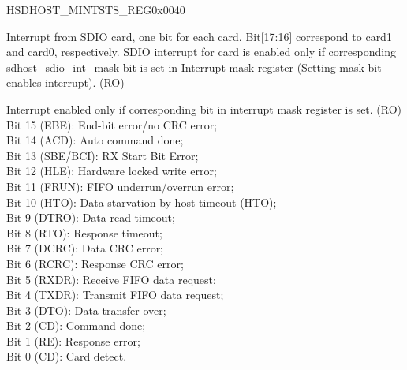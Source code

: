 \begin{register}{H}{SDHOST\_MINTSTS\_REG}{0x{}0040}\label{regdesc:MINTSTSREG}
%
%
%
\regnewline%
\begin{regdesc}\begin{reglist}
\item [SDHOST\_SDIO\_INTERRUPT\_MSK]Interrupt from SDIO card, one bit for each card. Bit[17:16] correspond to card1 and card0, respectively. SDIO interrupt for card is enabled only if corresponding sdhost\_sdio\_int\_mask bit is set in Interrupt mask register (Setting mask bit enables interrupt). (RO)
\item [SDHOST\_INT\_STATUS\_MSK]Interrupt enabled only if corresponding bit in interrupt mask register is set. (RO)\\
Bit 15 (EBE): End-bit error/no CRC error;\\
Bit 14 (ACD): Auto command done;\\
Bit 13 (SBE/BCI): RX Start Bit Error;\\
Bit 12 (HLE): Hardware locked write error; \\
Bit 11 (FRUN): FIFO underrun/overrun error;\\
Bit 10 (HTO): Data starvation by host timeout (HTO);\\
Bit 9 (DTRO): Data read timeout; \\
Bit 8 (RTO): Response timeout; \\
Bit 7 (DCRC): Data CRC error; \\
Bit 6 (RCRC): Response CRC error; \\
Bit 5 (RXDR): Receive FIFO data request; \\
Bit 4 (TXDR): Transmit FIFO data request;\\
Bit 3 (DTO): Data transfer over; \\
Bit 2 (CD): Command done; \\
Bit 1 (RE): Response error;\\
Bit 0 (CD): Card detect.
\end{reglist}\end{regdesc}
\end{register}


